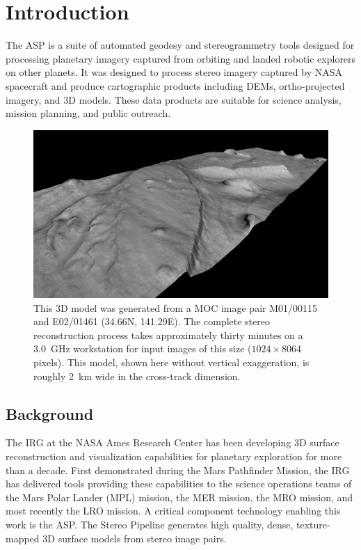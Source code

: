 \chapter{Introduction}

\acresetall

The  \ac{ASP} is a suite of automated geodesy and
stereogrammetry tools designed for processing planetary imagery
captured from orbiting and landed robotic explorers on other planets.
It was designed to process stereo imagery captured by \ac{NASA}
spacecraft and produce cartographic products including \acp{DEM},
ortho-projected imagery, and 3D models.  These data products are
suitable for science analysis, mission planning, and public outreach.

\begin{figure}[tb] 
   \centering
   \includegraphics[width=6.5in]{images/introduction/p19view2.png} 
   \caption{This 3D model was generated from a \acf{MOC} image
     pair M01/00115 and E02/01461 (34.66N, 141.29E).  The complete
     stereo reconstruction process takes approximately thirty minutes on
     a 3.0~GHz workstation for input images of this size ($1024 \times 8064$
     pixels).  This model, shown here without vertical 
     exaggeration, is roughly 2~km wide in the cross-track
     dimension. }
   \label{fig:p19}
\end{figure}

\section{Background}

The \ac{IRG} at the NASA Ames Research Center has been developing
3D surface reconstruction and visualization capabilities for planetary
exploration for more than a decade.  First demonstrated during the
Mars Pathfinder Mission, the \ac{IRG} has delivered tools providing
these capabilities to the science operations teams of the Mars Polar
Lander (MPL) mission, the \ac{MER} mission, the \ac{MRO} mission,
and most recently the \ac{LRO} mission. A critical component
technology enabling this work is the \acf{ASP}.  The Stereo Pipeline
generates high quality, dense, texture-mapped 3D surface models
from stereo image pairs.

